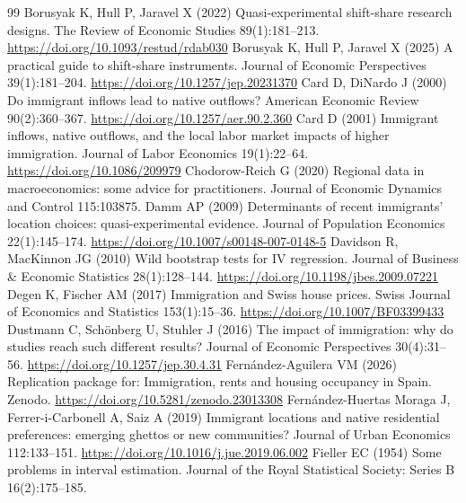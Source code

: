 \begin{thebibliography}{99}
 Borusyak K, Hull P, Jaravel X (2022) Quasi-experimental shift-share research designs. The Review of Economic Studies 89(1):181--213. \url{https://doi.org/10.1093/restud/rdab030}
 Borusyak K, Hull P, Jaravel X (2025) A practical guide to shift-share instruments. Journal of Economic Perspectives 39(1):181--204. \url{https://doi.org/10.1257/jep.20231370}
 Card D, DiNardo J (2000) Do immigrant inflows lead to native outflows? American Economic Review 90(2):360--367. \url{https://doi.org/10.1257/aer.90.2.360}
 Card D (2001) Immigrant inflows, native outflows, and the local labor market impacts of higher immigration. Journal of Labor Economics 19(1):22--64. \url{https://doi.org/10.1086/209979}
 Chodorow-Reich G (2020) Regional data in macroeconomics: some advice for practitioners. Journal of Economic Dynamics and Control 115:103875.
 Damm AP (2009) Determinants of recent immigrants' location choices: quasi-experimental evidence. Journal of Population Economics 22(1):145--174. \url{https://doi.org/10.1007/s00148-007-0148-5}
 Davidson R, MacKinnon JG (2010) Wild bootstrap tests for IV regression. Journal of Business \& Economic Statistics 28(1):128--144. \url{https://doi.org/10.1198/jbes.2009.07221}
 Degen K, Fischer AM (2017) Immigration and Swiss house prices. Swiss Journal of Economics and Statistics 153(1):15--36. \url{https://doi.org/10.1007/BF03399433}
 Dustmann C, Schönberg U, Stuhler J (2016) The impact of immigration: why do studies reach such different results? Journal of Economic Perspectives 30(4):31--56. \url{https://doi.org/10.1257/jep.30.4.31}
 Fernández-Aguilera VM (2026) Replication package for: Immigration, rents and housing occupancy in Spain. Zenodo. \url{https://doi.org/10.5281/zenodo.23013308}
 Fernández-Huertas Moraga J, Ferrer-i-Carbonell A, Saiz A (2019) Immigrant locations and native residential preferences: emerging ghettos or new communities? Journal of Urban Economics 112:133--151. \url{https://doi.org/10.1016/j.jue.2019.06.002}
 Fieller EC (1954) Some problems in interval estimation. Journal of the Royal Statistical Society: Series B 16(2):175--185.

\end{thebibliography}
